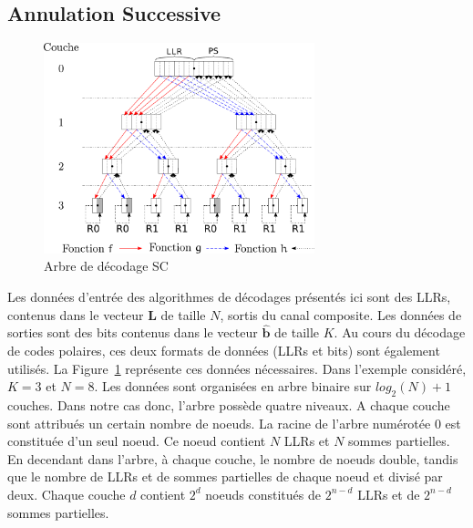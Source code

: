 \subsection{Annulation Successive}
\begin{figure}[t]
\centering
\includegraphics[width=0.7\textwidth]{main/ch1_fig/sc}
\caption{Arbre de décodage SC}
\label{fig:sc}
\end{figure}
Les données d'entrée des algorithmes de décodages présentés ici sont des LLRs, contenus dans le vecteur $\mathbold{L}$ de taille $N$, sortis du canal composite. Les données de sorties sont des bits contenus dans le vecteur $\mathbold{\hat{b}}$ de taille $K$. Au cours du décodage de codes polaires, ces deux formats de données (LLRs et bits) sont également utilisés. La Figure~\ref{fig:sc} représente ces données nécessaires. Dans l'exemple considéré, $K=3$ et $N=8$. Les données sont organisées en arbre binaire sur $log_2(N) + 1$ couches. Dans notre cas donc, l'arbre possède quatre niveaux. A chaque couche sont attribués un certain nombre de noeuds. La racine de l'arbre numérotée $0$ est constituée d'un seul noeud. Ce noeud contient $N$ LLRs et $N$ sommes partielles. En decendant dans l'arbre, à chaque couche, le nombre de noeuds double, tandis que le nombre de LLRs et de sommes partielles de chaque noeud et divisé par deux. Chaque couche $d$ contient $2^d$ noeuds constitués de $2^{n-d}$ LLRs et de $2^{n-d}$ sommes partielles. 


